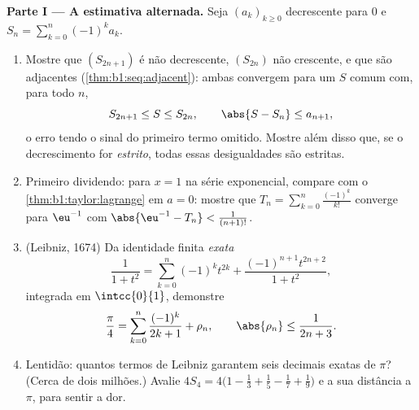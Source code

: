 \begin{problem}
\medskip
\noindent\textbf{Parte I --- A estimativa alternada.} Seja
$(a_k)_{k \geq 0}$ decrescente para $0$ e $S_n = \sum_{k=0}^{n}
(-1)^k a_k$.
\begin{enumerate}
  \item Mostre que $(S_{2n+1})$ é não decrescente, $(S_{2n})$ não crescente, e que
        são adjacentes (\cref{thm:b1:seq:adjacent}): ambas convergem para um $S$ comum com,
        para todo $n$,
        \[
        S_{2n+1} \leq S \leq S_{2n},
        \qquad
        \abs{S - S_n} \leq a_{n+1} ,
        \]
        o erro tendo o sinal do primeiro termo omitido.
        Mostre além disso que, se o decrescimento for \emph{estrito},
        todas essas desigualdades são estritas.
  \item Primeiro dividendo: para $x = 1$ na série exponencial,
        compare com o \cref{thm:b1:taylor:lagrange} em $a = 0$:
        mostre que $T_n = \sum_{k=0}^{n} \frac{(-1)^k}{k!}$
        converge para $\eu^{-1}$ com $\abs{\eu^{-1} - T_n} <
        \frac{1}{(n+1)!}$.
  \item (Leibniz, 1674) Da identidade finita \emph{exata}
        \[
        \frac{1}{1 + t^2} = \sum_{k=0}^{n} (-1)^k t^{2k}
        + \frac{(-1)^{n+1} t^{2n+2}}{1 + t^2} ,
        \]
        integrada em $\intcc{0}{1}$, demonstre
        \[
        \frac\pi4 = \sum_{k=0}^{n} \frac{(-1)^k}{2k+1} + \rho_n,
        \qquad \abs{\rho_n} \leq \frac{1}{2n+3} .
        \]
  \item Lentidão: quantos termos de Leibniz garantem seis decimais
        exatas de $\pi$? (Cerca de dois milhões.) Avalie $4 S_4
        = 4\bigl(1 - \frac13 + \frac15 - \frac17 +
        \frac19\bigr)$ e a sua
        distância a $\pi$, para sentir a dor.
\end{enumerate}


\end{problem}
